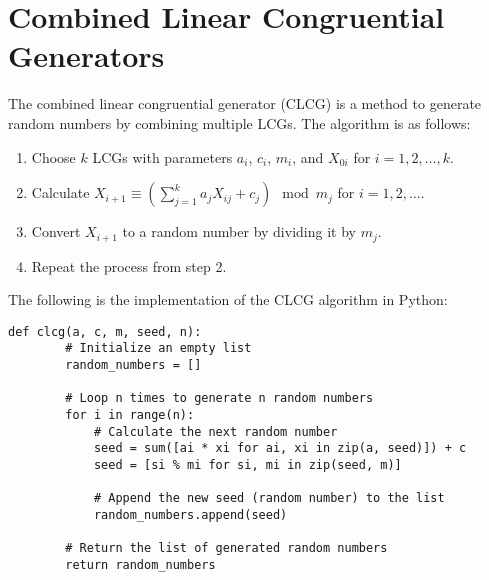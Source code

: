 \documentclass{article}
\begin{document}
\section{Combined Linear Congruential Generators}
The combined linear congruential generator (CLCG) is a method to generate random numbers by combining multiple LCGs. The algorithm is as follows:
\begin{enumerate}
    \item Choose $k$ LCGs with parameters $a_i$, $c_i$, $m_i$, and $X_{0i}$ for $i = 1, 2, \ldots, k$.
    \item Calculate $X_{i+1} \equiv \left(\sum_{j=1}^{k} a_jX_{ij} + c_j\right) \mod m_j$ for $i = 1, 2, \ldots$.
    \item Convert $X_{i+1}$ to a random number by dividing it by $m_j$.
    \item Repeat the process from step 2.
\end{enumerate}
The following is the implementation of the CLCG algorithm in Python:
\begin{lstlisting}[style=standard,caption={Combined Linear Congruential Generator Algorithm in Python}]
    def clcg(a, c, m, seed, n):
        # Initialize an empty list
        random_numbers = []

        # Loop n times to generate n random numbers
        for i in range(n):
            # Calculate the next random number
            seed = sum([ai * xi for ai, xi in zip(a, seed)]) + c
            seed = [si % mi for si, mi in zip(seed, m)]

            # Append the new seed (random number) to the list
            random_numbers.append(seed)

        # Return the list of generated random numbers
        return random_numbers
\end{lstlisting}
    
\end{document}
